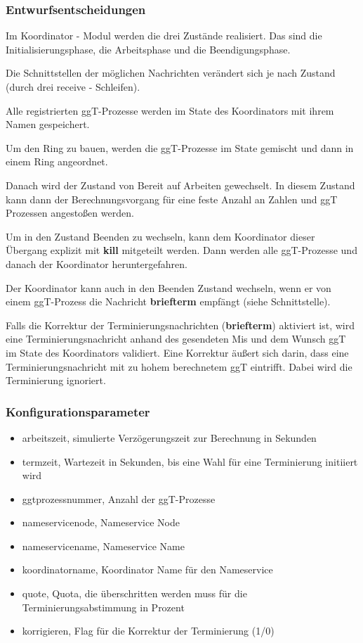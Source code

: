 \documentclass{article}
\begin{document}
\subsubsection{Entwurfsentscheidungen}
Im Koordinator - Modul werden die drei Zustände realisiert. Das sind die Initialisierungsphase, die Arbeitsphase und
die Beendigungsphase.

Die Schnittstellen der möglichen Nachrichten verändert sich je nach Zustand (durch drei receive - Schleifen).

Alle registrierten ggT-Prozesse werden im State des Koordinators mit ihrem Namen gespeichert.

Um den Ring zu bauen, werden die ggT-Prozesse im State gemischt und dann in einem Ring angeordnet.

Danach wird der Zustand von Bereit auf Arbeiten gewechselt. In diesem Zustand kann dann der Berechnungsvorgang für eine
feste Anzahl an Zahlen und ggT Prozessen angestoßen werden.

Um in den Zustand Beenden zu wechseln, kann dem Koordinator dieser Übergang explizit mit \textbf{kill} mitgeteilt werden.
Dann werden alle ggT-Prozesse und danach der Koordinator heruntergefahren.

Der Koordinator kann auch in den Beenden Zustand wechseln, wenn er von einem ggT-Prozess die Nachricht \textbf{briefterm}
empfängt (siehe Schnittstelle).

Falls die Korrektur der Terminierungsnachrichten (\textbf{briefterm}) aktiviert ist, wird eine Terminierungsnachricht
anhand des gesendeten Mis und dem Wunsch ggT im State des Koordinators validiert. Eine Korrektur äußert sich darin,
dass eine Terminierungsnachricht mit zu hohem berechnetem ggT eintrifft. Dabei wird die Terminierung ignoriert.

\subsubsection{Konfigurationsparameter}
\begin{itemize}
    \item arbeitszeit, simulierte Verzögerungszeit zur Berechnung in Sekunden
    \item termzeit, Wartezeit in Sekunden, bis eine Wahl für eine Terminierung initiiert wird
    \item ggtprozessnummer, Anzahl der ggT-Prozesse
    \item nameservicenode, Nameservice Node
    \item nameservicename, Nameservice Name
    \item koordinatorname, Koordinator Name für den Nameservice
    \item quote, Quota, die überschritten werden muss für die Terminierungsabstimmung in Prozent
    \item korrigieren, Flag für die Korrektur der Terminierung (1/0)
\end{itemize}
\end{document}
